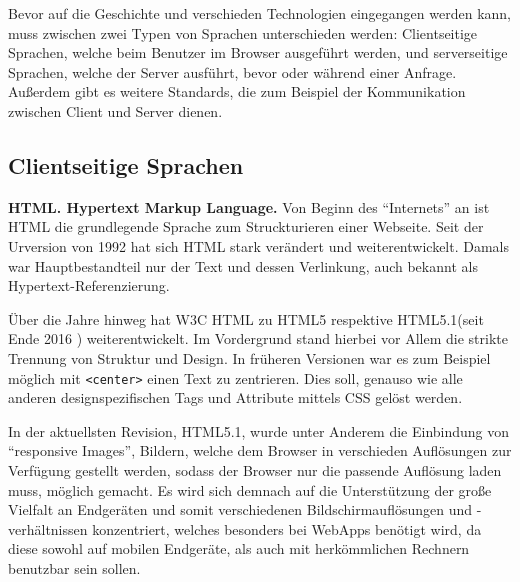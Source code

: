 \documentclass[a4paper,12pt,ngerman,listof=numbered]{scrartcl}      %
\let\oldcite\cite
\renewcommand{\cite}[1]{\textsuperscript{\oldcite{#1}}}
\providecommand{\inlinecode}[1]{\texttt{#1}}
\begin{document}
	Bevor auf die Geschichte und verschieden Technologien eingegangen werden kann, muss zwischen zwei Typen von Sprachen unterschieden werden: Clientseitige Sprachen, welche beim Benutzer im Browser ausgeführt werden, und serverseitige Sprachen, welche der Server ausführt, bevor oder während einer Anfrage. Außerdem gibt es weitere Standards, die zum Beispiel der Kommunikation zwischen Client und Server dienen.\par
	
	\subsection{Clientseitige Sprachen}
	
	\textbf{HTML. Hypertext Markup Language.} Von Beginn des ``Internets'' an ist HTML die grundlegende Sprache zum Struckturieren einer Webseite. Seit der Urversion von 1992 hat sich HTML stark verändert und weiterentwickelt. Damals war Hauptbestandteil nur der Text und dessen Verlinkung, auch bekannt als Hypertext-Referenzierung.\cite{htmlWiki}\par
	Über die Jahre hinweg hat W3C HTML zu HTML5 respektive HTML5.1(seit Ende 2016 \cite{html51}) weiterentwickelt. Im Vordergrund stand hierbei vor Allem die strikte Trennung von Struktur und Design. In früheren Versionen war es zum Beispiel möglich mit \inlinecode{<center>} einen Text zu zentrieren. Dies soll, genauso wie alle anderen designspezifischen Tags und Attribute mittels CSS gelöst werden.\par
	In der aktuellsten Revision, HTML5.1, wurde unter Anderem die Einbindung von ``responsive Images'', Bildern, welche dem Browser in verschieden Auflösungen zur Verfügung gestellt werden, sodass der Browser nur die passende Auflösung laden muss, möglich gemacht. Es wird sich demnach auf die Unterstützung der große Vielfalt an Endgeräten und somit verschiedenen Bildschirmauflösungen und -verhältnissen konzentriert, welches besonders bei WebApps benötigt wird, da diese sowohl auf mobilen Endgeräte, als auch mit herkömmlichen Rechnern benutzbar sein sollen.  \cite{html51blog}\par
	
\end{document}
